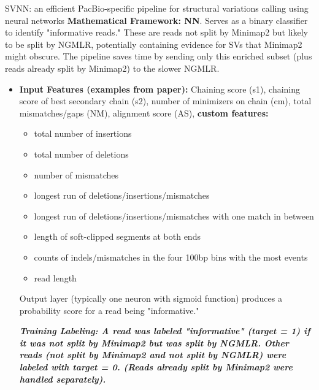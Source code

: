 \documentclass[twocolumn]{article}
\begin{document}
\begin{literaturepaper}{SVNN: an efficient PacBio-specific pipeline for structural variations calling using neural networks \cite{Akbarinejad2021}}
    \textbf{Mathematical Framework: NN}. Serves as a binary classifier to identify "informative reads." These are reads not split by Minimap2 but likely to be split by NGMLR, potentially containing evidence for SVs that Minimap2 might obscure. The pipeline saves time by sending only this enriched subset (plus reads already split by Minimap2) to the slower NGMLR.
    \begin{itemize}
        \item \textbf{Input Features (examples from paper):} Chaining score (s1), chaining score of best secondary chain (s2), number of minimizers on chain (cm), total mismatches/gaps (NM), alignment score (AS), \textbf{custom features:} 
        \begin{itemize}
            \item total number of insertions
            \item total number of deletions
            \item number of mismatches
            \item longest run of deletions/insertions/mismatches
            \item longest run of deletions/insertions/mismatches with one match in between
            \item length of soft-clipped segments at both ends
            \item counts of indels/mismatches in the four 100bp bins with the most events
            \item read length
        \end{itemize}
        Output layer (typically one neuron with sigmoid function) produces a probability score for a read being "informative."

        \textbf{\textit{Training Labeling: A read was labeled "informative" (target = 1) if it was not split by Minimap2 but was split by NGMLR. Other reads (not split by Minimap2 and not split by NGMLR) were labeled with target = 0. (Reads already split by Minimap2 were handled separately).}}
    \end{itemize}
\end{literaturepaper} 
\end{document}
